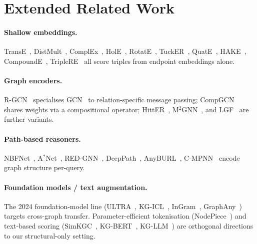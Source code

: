 \section{Extended Related Work}
\label{app:related-extended}

\paragraph{Shallow embeddings.}
TransE~\citep{transe}, DistMult~\citep{distmult}, ComplEx~\citep{complex}, HolE~\citep{nickel2016hole}, RotatE~\citep{rotate}, TuckER~\citep{balazevic2019tucker}, QuatE~\citep{zhang2019quate}, HAKE~\citep{hake}, CompoundE~\citep{ge2023compounde}, TripleRE~\citep{yu2022triplere} all score triples from endpoint embeddings alone.

\paragraph{Graph encoders.}
R-GCN~\citep{rgcn} specialises GCN~\citep{gcn} to relation-specific message passing; CompGCN~\citep{compgcn} shares weights via a compositional operator; HittER~\citep{chen2021hitter}, M$^2$GNN~\citep{wang2021m2gnn}, and LGF~\citep{mai2019cycle} are further variants.

\paragraph{Path-based reasoners.}
NBFNet~\citep{nbfnet}, A$^*$Net~\citep{astarnet}, RED-GNN~\citep{redgnn}, DeepPath~\citep{xiong2017deeppath}, AnyBURL~\citep{meilicke2019anyburl}, C-MPNN~\citep{huang2023theoryrwl} encode graph structure per-query.

\paragraph{Foundation models / text augmentation.}
The 2024 foundation-model line (ULTRA~\citep{galkin2024ultra}, KG-ICL~\citep{kgicl2024}, InGram~\citep{ingram2024}, GraphAny~\citep{zhao2024graphany}) targets cross-graph transfer. Parameter-efficient tokenisation (NodePiece~\citep{nodepiece2022}) and text-based scoring (SimKGC~\citep{simkgc2022}, KG-BERT~\citep{kgbert2019}, KG-LLM~\citep{kgllm2024}) are orthogonal directions to our structural-only setting.
